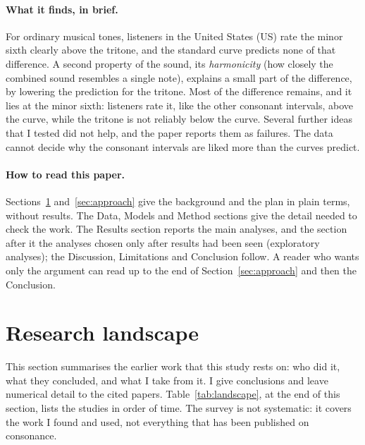 \documentclass[11pt,a4paper]{article}
\begin{document}
\paragraph{What it finds, in brief.}
For ordinary musical tones, listeners in the United States (US) rate the minor sixth clearly above
the tritone, and the standard curve predicts none of that difference. A second property of
the sound, its \emph{harmonicity} (how closely the combined sound resembles a single note),
explains a small part of the difference, by lowering the prediction for the tritone. Most of
the difference remains, and it lies at the minor sixth: listeners rate it, like the other
consonant intervals, above the curve, while the tritone is not reliably below the curve.
Several further ideas that I tested did not help, and the paper reports them as failures. The
data cannot decide why the consonant intervals are liked more than the curves predict.

\paragraph{How to read this paper.}
Sections~\ref{sec:landscape} and~\ref{sec:approach} give the background and the plan in plain
terms, without results. The Data, Models and Method sections give the detail needed to check
the work. The Results section reports the main analyses, and the section after it the
analyses chosen only after results had been seen (exploratory analyses); the Discussion,
Limitations and Conclusion follow. A reader who wants only the argument can read up to the end
of Section~\ref{sec:approach} and then the Conclusion.

\section{Research landscape}
\label{sec:landscape}
This section summarises the earlier work that this study rests on: who did it, what they
concluded, and what I take from it. I give conclusions and leave numerical detail to the
cited papers. Table~\ref{tab:landscape}, at the end of this section, lists the studies in order of time. The survey is not
systematic: it covers the work I found and used, not everything that has been published on
consonance.
\end{document}
